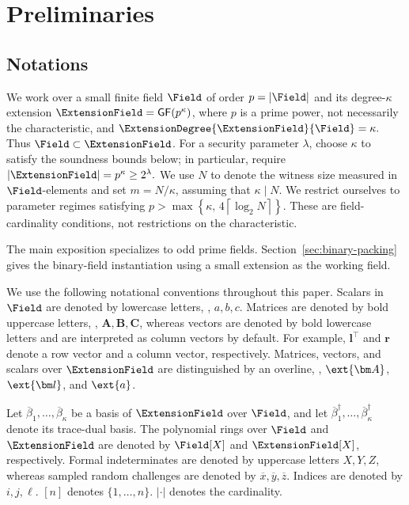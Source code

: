 \section{Preliminaries}


\subsection{Notations}
\label{sec:notation}
We work over a small finite field \(\Field\) of order
\(p=|\Field|\) and its degree-\(\kappa\) extension
\(\ExtensionField=\mathsf{GF}(p^\kappa)\), where \(p\) is a
prime power, not necessarily the characteristic, and
$
\ExtensionDegree{\ExtensionField}{\Field}=\kappa.
$
Thus \(\Field\subset\ExtensionField\).
For a security parameter \(\lambda\), choose \(\kappa\)
to satisfy the soundness bounds below; in particular, require
\(
    \lvert\ExtensionField\rvert
    =
    p^\kappa
    \geq
    2^\lambda.
\)
We use \(N\) to denote the witness size measured in
\(\Field\)-elements and set \(m=N/\kappa\), assuming that
\(\kappa\mid N\). We restrict ourselves
to parameter regimes satisfying
\(
    p
    >
    \max\left\{
        \kappa,\,
        4\left\lceil\log_2 N\right\rceil
    \right\}.
\)
These are field-cardinality conditions, not restrictions on the
characteristic.

The main exposition specializes to odd prime fields.
Section~\ref{sec:binary-packing} gives the binary-field
instantiation using a small extension as the working field.

We use the following notational conventions throughout this paper.
Scalars in \(\Field\) are denoted by lowercase letters,
\eg, \(a,b,c\).
Matrices are denoted by bold uppercase letters,
\eg, \(\bm A,\bm B,\bm C\),
whereas vectors are denoted by bold lowercase letters and are
interpreted as column vectors by default.
For example, \(\bm l^\top\) and \(\bm r\) denote a row vector
and a column vector, respectively.
Matrices, vectors, and scalars over \(\ExtensionField\) are
distinguished by an overline,
\eg, \(\ext{\bm A}\), \(\ext{\bm l}\), and \(\ext{a}\).

Let
\(\overline{\beta}_1,\ldots,\overline{\beta}_\kappa\)
be a basis of \(\ExtensionField\) over \(\Field\), and let
\(\overline{\beta}_1^\dagger,\ldots,
\overline{\beta}_\kappa^\dagger\)
denote its trace-dual basis. 
The polynomial rings over \(\Field\) and \(\ExtensionField\) are
denoted by \(\Field[X]\) and \(\ExtensionField[X]\), respectively.
Formal indeterminates are denoted by uppercase letters
\(X,Y,Z\), whereas sampled random challenges are denoted by
\(\overline{x},\overline{y},\overline{z}\).
Indices are denoted by \(i,j,\ell\).
$[n]$ denotes $\{ 1, \ldots, n \}$.
$|\cdot|$ denotes the cardinality.


